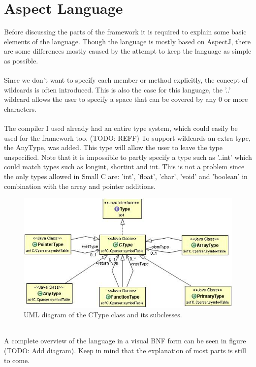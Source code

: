 \documentclass[a4paper]{report}
\begin{document}
\section{Aspect Language}
Before discussing the parts of the framework it is required to explain some basic elements of the language. Though the language is mostly based on AspectJ, there are some differences mostly caused by the attempt to keep the language as simple as possible.\\
\\
Since we don't want to specify each member or method explicitly, the concept of wildcards is often introduced. This is also the case for this language, the '..' wildcard allows the user to specify a space that can be covered by any 0 or more characters.\\
\\
The compiler I used already had an entire type system, which could easily be used for the framework too. (TODO: REFF) To support wildcards an extra type, the AnyType, was added. This type will allow the user to leave the type unspecified. Note that it is impossible to partly specify a type such as '..int' which could match types such as longint, shortint and int. This is not a problem since the only types allowed in Small C are: 'int', 'float', 'char', 'void' and 'boolean' in combination with the array and pointer additions.\\
\begin{figure}
\centering
\includegraphics[scale=0.7]{images/AOFC/CType.jpg}
\caption{UML diagram of the CType class and its subclesses.}
\label{fig:CType}
\end{figure}
\\
A complete overview of the language in a visual BNF form can be seen in figure (TODO: Add diagram). Keep in mind that the explanation of most parts is still to come.\\
\end{document}
